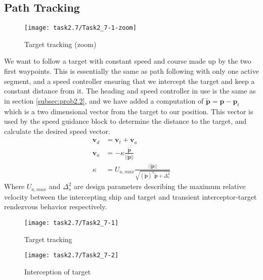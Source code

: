 
\subsection{Path Tracking}\label{subsec:prob2.3}

\begin{wrapfigure}{r}{0.5 \textwidth}
\vspace{-15mm}
\centering
\texttt{[image: task2.7/Task2\_7-1-zoom]}
\caption{Target tracking (zoom)}
\label{fig:2.7-tracking-zoom}
\vspace{-20mm}
\end{wrapfigure}
We want to follow a target with constant speed and course made up by the two first waypoints. This is essentially the same as path following with only one active segment, and a speed controller ensuring that we intercept the target and keep a constant distance from it. The heading and speed controller in use is the same as in section \ref{subsec:prob2.2}, and we have added a computation of $\tilde{\mathbf{p}} = \mathbf{p} - \mathbf{ p}_t$ which is a two dimensional vector from the target to our position. This vector is used by the speed guidance block to determine the distance to the target, and calculate the desired speed vector.
\begin{equation}
\begin{split}
\mathbf{v}_d &= \mathbf{v}_t + \mathbf{v}_a \\
\mathbf{v}_a &= -\kappa \frac{ \tilde{ \mathbf{p} } } { || \tilde{ \mathbf{p} } ||} \\
\kappa &= U_{a,max} \frac{ || \tilde{ \mathbf{p} } || } { \sqrt{ ( \tilde{ \mathbf{p}} )^T  \tilde{ \mathbf{p} } + \Delta_s^2 }}
\end{split}
\end{equation}
Where $U_{a,max}$ and $\Delta_s^2$ are design parameters describing the maximum relative velocity between the intercepting ship and target and transient interceptor-target rendezvous behavior respectively. 
\begin{figure}[h]
\begin{center}
 \texttt{[image: task2.7/Task2\_7-1]}
\caption{Target tracking}
\label{fig:2.7-tracking}
\end{center}
\end{figure}

\begin{figure}[h]
\begin{center}
 \texttt{[image: task2.7/Task2\_7-2]}
\caption{Interception of target}
\label{fig:2.7-D2T}
\end{center}
\end{figure}